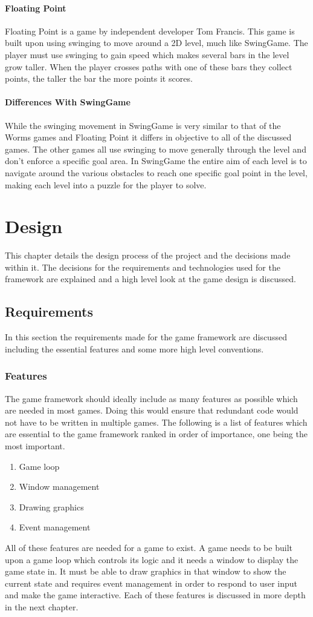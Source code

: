 \documentclass[]{report}
\begin{document}
			\subsubsection{Floating Point}
			Floating Point\cite{floatingpoint} is a game by independent developer Tom Francis. This game is built upon using swinging to move around a 2D level, much like SwingGame. The player must use swinging to gain speed which makes several bars in the level grow taller. When the player crosses paths with one of these bars they collect points, the taller the bar the more points it scores.
			\subsubsection{Differences With SwingGame}
			While the swinging movement in SwingGame is very similar to that of the Worms games and Floating Point it differs in objective to all of the discussed games. The other games all use swinging to move generally through the level and don't enforce a specific goal area. In SwingGame the entire aim of each level is to navigate around the various obstacles to reach one specific goal point in the level, making each level into a puzzle for the player to solve.

\chapter{Design}
This chapter details the design process of the project and the decisions made within it. The decisions for the requirements and technologies used for the framework are explained and a high level look at the game design is discussed.
	\section{Requirements}
	In this section the requirements made for the game framework are discussed including the essential features and some more high level conventions.
		\subsection{Features}
		The game framework should ideally include as many features as possible which are needed in most games. Doing this would ensure that redundant code would not have to be written in multiple games. The following is a list of features which are essential to the game framework ranked in order of importance, one being the most important.
		\begin{enumerate}
			\item{Game loop}
			\item{Window management}
			\item{Drawing graphics}
			\item{Event management}
		\end{enumerate}
		All of these features are needed for a game to exist. A game needs to be built upon a game loop which controls its logic and it needs a window to display the game state in. It must be able to draw graphics in that window to show the current state and requires event management in order to respond to user input and make the game interactive. Each of these features is discussed in more depth in the next chapter.
		
\end{document}
